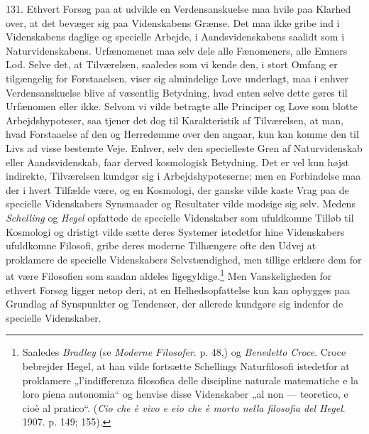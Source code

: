 \documentclass[12pt,a4paper]{book}
\newcommand{\apage}[1]{\marginnote{\footnotesize\textit{[#1]}}}
\begin{document}
131. Ethvert Forsøg paa at udvikle en Verdensanskuelse maa hvile paa Klarhed over, at
det bevæger sig paa Videnskabens Grænse. Det maa ikke gribe ind i Videnskabens daglige
og specielle Arbejde, i Aandsvidenskabens saalidt som i Naturvidenskabens. Urfænomenet
maa selv dele alle Fænomeners, alle Emners Lod. Selve det, at Tilværelsen, saaledes som
vi kende den, i stort Omfang er tilgængelig for Forstaaelsen, viser sig almindelige Love
underlagt, maa i enhver Verdensanskuelse blive af væsentlig Betydning, hvad enten selve
dette gøres til Urfænomen eller ikke. Selvom vi \apage{313} vilde betragte alle Principer og Love
som blotte Arbejdshypoteser, saa tjener det dog til Karakteristik af Tilværelsen, at
man, hvad Forstaaelse af den og Herredømme over den angaar, kun kan komme den til Livs
ad visse bestemte Veje. Enhver, selv den specielleste Gren af Naturvidenskab eller
Aandsvidenskab, faar derved kosmologisk Betydning. Det er vel kun højst indirekte,
Tilværelsen kundgør sig i Arbejdshypoteserne; men en Forbindelse maa der i hvert
Tilfælde være, og en Kosmologi, der ganske vilde kaste Vrag paa de specielle
Videnskabers Synsmaader og Resultater vilde modsige sig selv. Medens \emph{Schelling} og
\emph{Hegel} opfattede de specielle Videnskaber som ufuldkomne Tilløb til Kosmologi og
dristigt vilde sætte deres Systemer istedetfor hine Videnskabers ufuldkomne Filosofi,
gribe deres moderne Tilhængere ofte den Udvej at proklamere de specielle Videnskabers
Selvstændighed, men tillige erklære dem for at være Filosofien som saadan aldeles
ligegyldige.\footnote{Saaledes \emph{Bradley} (se \emph{Moderne Filosofer}. p. 48,) og
\emph{Benedetto Croce}. Croce bebrejder Hegel, at han vilde fortsætte Schellings
Naturfilosofi istedetfor at proklamere „l'indifferenza filosofica delle discipline
naturale matematiche e la loro piena autonomia“ og henvise disse Videnskaber „al non ---
teoretico, e cioè al pratico“. (\emph{Cio che è vivo e eio che è morto nella filosofia
del Hegel}. 1907. p. 149; 155).} Men Vanskeligheden for ethvert Forsøg ligger netop
deri, at en Helhedsopfattelse kun kan opbygges paa Grundlag af Synspunkter og Tendenser,
der allerede kundgøre sig indenfor de specielle Videnskaber.
\end{document}
